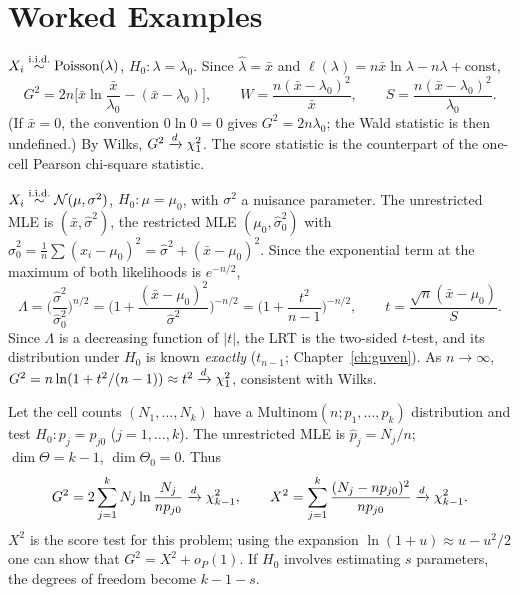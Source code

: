 \documentclass[main.tex]{subfiles}
\begin{document}
\section{Worked Examples}

\begin{example}\label{ex:poisson-lrt}
$X_i\overset{\text{i.i.d.}}{\sim}\text{Poisson}(\lambda)$, $H_0:\lambda=\lambda_0$. Since $\hat\lambda=\bar x$ and $\ell(\lambda)=n\bar x\ln\lambda-n\lambda+\text{const}$,
\[
G^2=2n\Big[\bar x\ln\frac{\bar x}{\lambda_0}-(\bar x-\lambda_0)\Big],\qquad
W=\frac{n(\bar x-\lambda_0)^2}{\bar x},\qquad S=\frac{n(\bar x-\lambda_0)^2}{\lambda_0}.
\]
(If $\bar x=0$, the convention $0\ln0=0$ gives $G^2=2n\lambda_0$; the Wald statistic is then undefined.) By Wilks, $G^2\xrightarrow{d}\chi^2_1$. The score statistic is the counterpart of the one-cell Pearson chi-square statistic.
\end{example}

\begin{example}[Normal with Unknown Variance: LRT $=$ $t$-Test]\label{ex:lrt-t}
$X_i\overset{\text{i.i.d.}}{\sim}\mathcal{N}(\mu,\sigma^2)$, $H_0:\mu=\mu_0$, with $\sigma^2$ a nuisance parameter. The unrestricted MLE is $(\bar x,\hat\sigma^2)$, the restricted MLE $(\mu_0,\hat\sigma_0^2)$ with $\hat\sigma_0^2=\frac1n\sum(x_i-\mu_0)^2=\hat\sigma^2+(\bar x-\mu_0)^2$. Since the exponential term at the maximum of both likelihoods is $e^{-n/2}$,
\[
\Lambda=\Big(\frac{\hat\sigma^2}{\hat\sigma_0^2}\Big)^{n/2}=\Big(1+\frac{(\bar x-\mu_0)^2}{\hat\sigma^2}\Big)^{-n/2}=\Big(1+\frac{t^2}{n-1}\Big)^{-n/2},\qquad t=\frac{\sqrt n(\bar x-\mu_0)}{S}.
\]
Since $\Lambda$ is a decreasing function of $|t|$, the LRT is the two-sided $t$-test, and its distribution under $H_0$ is known \emph{exactly} ($t_{n-1}$; Chapter~\ref{ch:guven}). As $n\to\infty$, $G^2=n\ln(1+t^2/(n-1))\approx t^2\xrightarrow{d}\chi^2_1$, consistent with Wilks.
\end{example}

\begin{example}\label{ex:multinom}
Let the cell counts $(N_1,\dots,N_k)$ have a $\text{Multinom}(n;p_1,\dots,p_k)$ distribution and test $H_0:p_j=p_{j0}$ ($j=1,\dots,k$). The unrestricted MLE is $\hat p_j=N_j/n$; $\dim\Theta=k-1$, $\dim\Theta_0=0$. Thus
\[
G^2=2\sum_{j=1}^kN_j\ln\frac{N_j}{np_{j0}}\xrightarrow{d}\chi^2_{k-1},\qquad
X^2=\sum_{j=1}^k\frac{(N_j-np_{j0})^2}{np_{j0}}\xrightarrow{d}\chi^2_{k-1}.
\]
$X^2$ is the score test for this problem; using the expansion $\ln(1+u)\approx u-u^2/2$ one can show that $G^2=X^2+o_P(1)$. If $H_0$ involves estimating $s$ parameters, the degrees of freedom become $k-1-s$.
\end{example}
\end{document}
